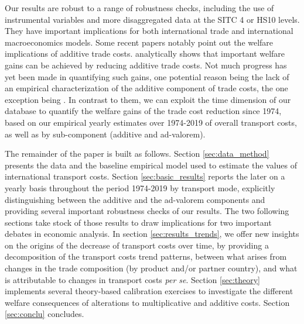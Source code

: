 \documentclass[a4paper,11pt]{article}
\begin{document}
Our results are robust to a range of robustness checks, including the use of instrumental variables and more disaggregated data at the SITC 4 or HS10 levels. They have important implications for both international trade and international macroeconomics models. Some recent papers notably point out the welfare implications of additive trade costs. \cite{sorensen2014} analytically shows that important welfare gains can be achieved by reducing additive trade costs. Not much progress has yet been made in quantifying such gains, one potential reason being the lack of an empirical characterization of the additive component of trade costs, the one exception being \citealp{Irrazabal_2015}. In contrast to them, we can exploit the time dimension of our database to quantify the welfare gains of the trade cost reduction since 1974, based on our empirical yearly estimates over 1974-2019 of overall transport costs, as well as by sub-component (additive and ad-valorem).\smallskip


The remainder of the paper is built as follows. Section \ref{sec:data_method} presents the data and the baseline empirical model used to estimate the values of international transport costs. Section \ref{sec:basic_results} reports the later on a yearly basis throughout the period 1974-2019 by transport mode, explicitly distinguishing between the additive and the ad-valorem components and providing several important robustness checks of our results. The two following sections take stock of those results to draw implications for two important debates in economic analysis. In section \ref{sec:results_trends}, we offer new insights on the origins of the decrease of transport costs over time, by providing a decomposition of the transport costs trend patterns, between what arises from changes in the trade composition (by product and/or partner country), and what is attributable to changes in transport costs \textit{per se}. Section \ref{sec:theory} implements several theory-based calibration exercises to investigate the different welfare consequences of alterations to multiplicative and additive costs. Section \ref{sec:conclu} concludes.
\end{document}
